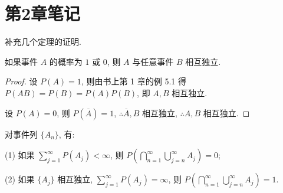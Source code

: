 \documentclass{ctexart}
\begin{document}
\section{第2章笔记}
补充几个定理的证明.
\begin{theorem}
    如果事件 $A$ 的概率为 $1$ 或 $0$, 则 $A$ 与任意事件 $B$ 相互独立.
\end{theorem}
\begin{proof}
    设 $P(A)=1$, 则由书上第 1 章的例 5.1 得 $P(AB)=P(B)=P(A)P(B)$, 即 $A,B$ 相互独立.

    设 $P(A)=0$, 则 $P(\overline{A})=1$, $\therefore\overline{A},B$ 相互独立, $\therefore A,B$ 相互独立.
\end{proof}
\begin{theorem}\label{t3.2}
    对事件列 $\{A_n\}$, 有:

    (1) 如果 $\sum\limits_{j=1}^\infty P(A_j)<\infty$, 则 $P\left(\bigcap\limits_{n=1}^\infty\bigcup\limits_{j=n}^\infty A_j\right)=0$;

    (2) 如果 $\{A_j\}$ 相互独立, $\sum\limits_{j=1}^\infty P(A_j)=\infty$, 则 $P\left(\bigcap\limits_{n=1}^\infty\bigcup\limits_{j=n}^\infty A_j\right)=1$.
\end{theorem}
\end{document}

